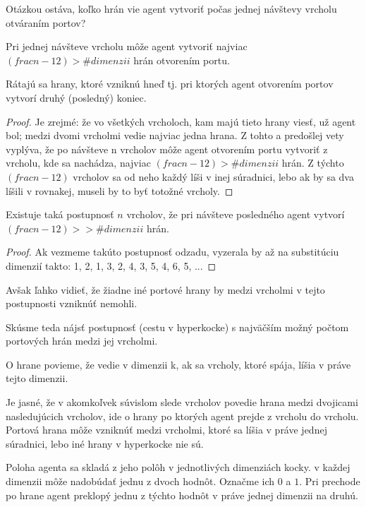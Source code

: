 Otázkou ostáva, koľko hrán vie agent vytvoriť počas jednej návštevy vrcholu
otváraním portov? 
\begin{lem}
Pri jednej návšteve vrcholu môže agent vytvoriť najviac $(frac{n-1}{2}) > \#dimenzii$
hrán otvorením portu.
\end{lem}
\begin{pozn}
Rátajú sa hrany, ktoré vzniknú hneď tj. pri ktorých agent otvorením portov
vytvorí druhý (posledný) koniec.
\end{pozn}
\begin{proof}
Je zrejmé: že vo všetkých vrcholoch, kam majú tieto hrany
viesť, už agent bol; medzi dvomi vrcholmi vedie najviac jedna hrana. Z tohto
a predošlej vety vyplýva, že po návšteve n vrcholov môže agent otvorením
portu vytvoriť z vrcholu, kde sa nachádza, najviac $(frac{n-1}{2}) > \#dimenzii$ hrán. Z
týchto $(frac{n-1}{2})$ vrcholov sa od neho každý líši v inej súradnici,
lebo ak by sa dva líšili v rovnakej, museli by to byť totožné vrcholy. 
\end{proof}
\begin{lem}
Existuje taká postupnosť $n$ vrcholov, že pri návšteve posledného agent
vytvorí $(frac{n-1}{2}) > >\#dimenzii$ hrán.
\end{lem}
\begin{proof}
Ak vezmeme takúto postupnosť odzadu, vyzerala by až na substitúciu dimenzií
takto: 1, 2, 1, 3, 2, 4, 3, 5, 4, 6, 5, ...
\end{proof}
\begin{pozn}
Avšak ľahko vidieť, že žiadne iné portové hrany by medzi vrcholmi v tejto
postupnosti vzniknúť nemohli.
\end{pozn}
Skúsme teda nájsť postupnosť (cestu v hyperkocke) s najväčším možný počtom 
portových hrán medzi jej vrcholmi.
\begin{ozn}
O hrane povieme, že vedie v dimenzii k, ak sa vrcholy, ktoré spája, líšia v
práve tejto dimenzii. 
\end{ozn}
Je jasné, že v akomkoľvek súvislom slede vrcholov povedie hrana
medzi dvojicami nasledujúcich vrcholov, ide o hrany po ktorých agent prejde
z vrcholu do vrcholu.
Portová hrana môže vzniknúť medzi vrcholmi, ktoré sa líšia v práve jednej
súradnici, lebo iné hrany v hyperkocke nie sú. 
\begin{ozn}
Poloha agenta sa skladá z jeho polôh v jednotlivých dimenziách kocky. v
každej dimenzii môže nadobúdať jednu z dvoch hodnôt. Označme ich $0$ a $1$.
Pri prechode po hrane agent preklopý jednu z týchto hodnôt v práve jednej
dimenzii na druhú.
\end{ozn}

